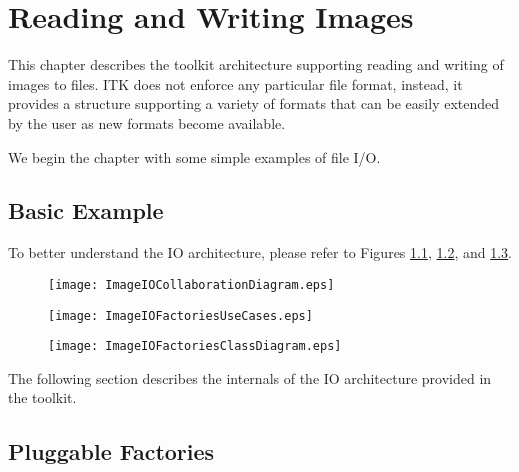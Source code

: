 

\chapter{Reading and Writing Images}
\label{sec:IO}

This chapter describes the toolkit architecture supporting reading and
writing of images to files. ITK does not enforce any particular file format,
instead, it provides a structure supporting a variety of formats that can
be easily extended by the user as new formats become available.

We begin the chapter with some simple examples of file I/O.

\section{Basic Example}
\label{sec:ImagReadWrite}


To better understand the IO architecture, please refer to Figures
\ref{fig:ImageIOCollaborationDiagram},
\ref{fig:ImageIOFactoriesUseCases}, and
\ref{fig:ImageIOFactoriesClassDiagram}.

\begin{figure}
\center
\texttt{[image: ImageIOCollaborationDiagram.eps]}
 \label{fig:ImageIOCollaborationDiagram}
\end{figure}

\begin{figure}
\center
\texttt{[image: ImageIOFactoriesUseCases.eps]}
\label{fig:ImageIOFactoriesUseCases}
\end{figure}

\begin{figure}
\center
\texttt{[image: ImageIOFactoriesClassDiagram.eps]}
\label{fig:ImageIOFactoriesClassDiagram}
\end{figure}


The following section describes the internals of the IO architecture provided
in the toolkit.

\section{Pluggable Factories}
\label{sec:ImageIOPluggableFactories}

